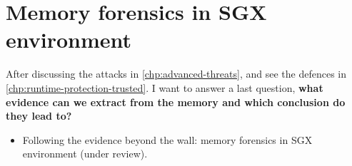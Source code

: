 \chapter{Memory forensics in SGX environment}
\label{chp:forensic}

After discussing the attacks in \ref{chp:advanced-threats}, and see the 
defences in \ref{chp:runtime-protection-trusted}.
I want to answer a last question, \textbf{what evidence can we extract from the 
memory and which conclusion do they lead to?}

\begin{itemize}
	\item Following the evidence beyond the wall: memory forensics in SGX
	environment (under review).
\end{itemize}